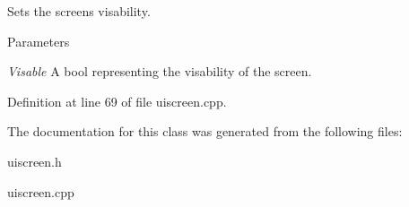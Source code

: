Sets the screens visability. 


\begin{DoxyParams}{Parameters}
\item[{\em Visable}]A bool representing the visability of the screen. \end{DoxyParams}


Definition at line 69 of file uiscreen.cpp.



The documentation for this class was generated from the following files:\begin{DoxyCompactItemize}
\item 
uiscreen.h\item 
uiscreen.cpp\end{DoxyCompactItemize}
